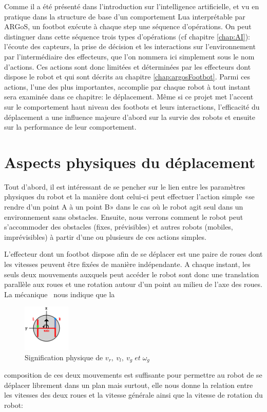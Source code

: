 Comme il a été présenté dans l'introduction sur l'intelligence artificielle, et vu en pratique dans la structure de base d'un comportement Lua interprétable par ARGoS, un footbot exécute à chaque step une séquence d'opérations. On peut distinguer dans cette séquence trois types d'opérations (cf chapitre \ref{chap:AI}): l'écoute des capteurs, la prise de décision et les interactions sur l'environnement par l'intermédiaire des effecteurs, que l'on nommera ici simplement sous le nom d'actions. Ces actions sont donc limitées et déterminées par les effecteurs dont dispose le robot et qui sont décrits au chapitre \ref{chap:argosFootbot}. Parmi ces actions, l'une des plus importantes, accomplie par chaque robot à tout instant sera examinée dans ce chapitre: le déplacement. Même si ce projet met l'accent sur le comportement haut niveau des footbots et leurs interactions, l'efficacité du déplacement a une influence majeure d'abord sur la survie des robots et ensuite sur la performance de leur comportement.

\section{Aspects physiques du déplacement}

Tout d'abord, il est intéressant de se pencher sur le lien entre les paramètres physiques du robot et la manière dont celui-ci peut effectuer l'action simple «se rendre d'un point A à un point B» dans le cas où le robot agit seul dans un environnement sans obstacles. Ensuite, nous verrons comment le robot peut s’accommoder des obstacles (fixes, prévisibles) et autres robots (mobiles, imprévisibles) à partir d'une ou plusieurs de ces actions simples.

L'effecteur dont un footbot dispose afin de se déplacer est une paire de roues dont les vitesses peuvent être fixées de manière indépendante. A chaque instant, les seuls deux mouvements auxquels peut accéder le robot sont donc une translation parallèle aux roues et une rotation autour d'un point au milieu de l'axe des roues. La mécanique~\cite{meca} nous indique que la\begin{figure}
\centering
  \includegraphics[width=0.2\textwidth]{pics/robotWheels.png}
  \vspace{-1em}
  \caption{Signification physique de \(v_r,\: v_l,\: v_g \; et \; \omega_g \) \cite{argosSite1}}
  \vspace{-2em}
\end{figure} composition de ces deux mouvements est suffisante pour permettre au robot de se déplacer librement dans un plan mais surtout, elle nous donne la relation entre les vitesses des deux roues et la vitesse générale ainsi que la vitesse de rotation du robot:

